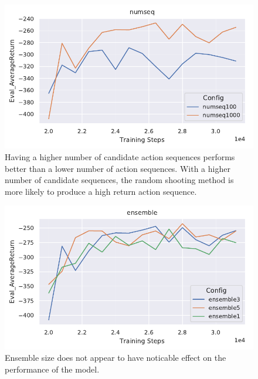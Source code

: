 \documentclass[letterpaper, 10pt]{article}
\begin{document}
\begin{figure}[h]
	\centering
	\includegraphics{q4_numseq.pdf}
	\caption{Having a higher number of candidate action sequences performs better than a lower number
			of action sequences. With a higher number of candidate sequences, the random shooting method
			is more likely to produce a high return action sequence.}
\end{figure}

\begin{figure}[h]
	\centering
	\includegraphics{q4_ensemble.pdf}
	\caption{Ensemble size does not appear to have noticable effect on the performance of the model. }
\end{figure}
\end{document}
